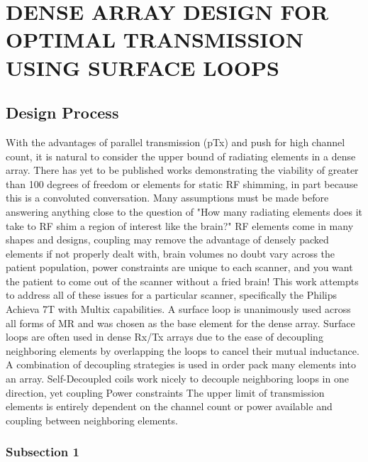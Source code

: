 
\chapter{DENSE ARRAY DESIGN FOR OPTIMAL TRANSMISSION USING SURFACE LOOPS}\label{chapters:chapter_2}
\vspace{-7mm}

\section{Design Process}\label{sec:ch_2_sec_1}
With the advantages of parallel transmission (pTx) and push for high channel count, it is natural to consider the upper bound of radiating elements in a dense array. 
There has yet to be published works demonstrating the viability of greater than 100 degrees of freedom or elements for static RF shimming, 
in part because this is a convoluted conversation.
Many assumptions must be made before answering anything close to the question of "How many radiating elements does it take to RF shim a region of interest like the brain?"
RF elements come in many shapes and designs, coupling may remove the advantage of densely packed elements if not properly dealt with, 
brain volumes no doubt vary across the patient population, power constraints are unique
to each scanner, and you want the patient to come out of the scanner without a fried brain! This work attempts to address all of these issues for a particular scanner, 
specifically the Philips Achieva 7T with Multix capabilities.
A surface loop is unanimously used across all forms of MR and was chosen as the base element for the dense array.
Surface loops are often used in dense Rx/Tx arrays due to the ease of decoupling neighboring elements by overlapping the loops to cancel their mutual inductance.
A combination of decoupling strategies is used in order pack many elements into an array. Self-Decoupled coils work nicely to decouple neighboring loops in one direction, 
yet coupling 
Power constraints
The upper limit of transmission elements is entirely dependent on the channel count or power available and coupling between neighboring elements. 


\subsection{Subsection 1}\label{subsec:subsec_2.1.1}


\clearpage

